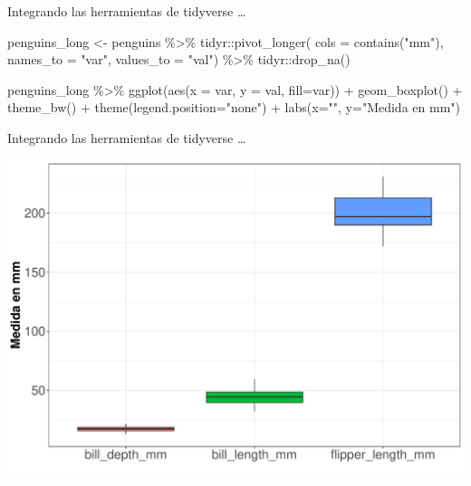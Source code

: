 \documentclass[
  ignorenonframetext,
  aspectratio=169]{beamer}
\newenvironment{Shaded}{\begin{snugshade}}{\end{snugshade}}
\newcommand{\AttributeTok}[1]{\textcolor[rgb]{0.77,0.63,0.00}{#1}}
\newcommand{\FunctionTok}[1]{\textcolor[rgb]{0.00,0.00,0.00}{#1}}
\newcommand{\NormalTok}[1]{#1}
\newcommand{\OtherTok}[1]{\textcolor[rgb]{0.56,0.35,0.01}{#1}}
\newcommand{\SpecialCharTok}[1]{\textcolor[rgb]{0.00,0.00,0.00}{#1}}
\newcommand{\StringTok}[1]{\textcolor[rgb]{0.31,0.60,0.02}{#1}}
\begin{document}
\begin{frame}[fragile]{Integrando las herramientas de tidyverse
\ldots{}}
\protect\hypertarget{integrando-las-herramientas-de-tidyverse}{}
\begin{Shaded}
\begin{Highlighting}[]
\NormalTok{penguins\_long }\OtherTok{\textless{}{-}}\NormalTok{ penguins }\SpecialCharTok{\%\textgreater{}\%} 
\NormalTok{  tidyr}\SpecialCharTok{::}\FunctionTok{pivot\_longer}\NormalTok{(}
    \AttributeTok{cols =} \FunctionTok{contains}\NormalTok{(}\StringTok{"mm"}\NormalTok{),}
    \AttributeTok{names\_to =} \StringTok{"var"}\NormalTok{, }\AttributeTok{values\_to =} \StringTok{"val"}\NormalTok{) }\SpecialCharTok{\%\textgreater{}\%} 
\NormalTok{  tidyr}\SpecialCharTok{::}\FunctionTok{drop\_na}\NormalTok{()}
\end{Highlighting}
\end{Shaded}

\begin{Shaded}
\begin{Highlighting}[]
\NormalTok{penguins\_long }\SpecialCharTok{\%\textgreater{}\%} 
  \FunctionTok{ggplot}\NormalTok{(}\FunctionTok{aes}\NormalTok{(}\AttributeTok{x =}\NormalTok{ var, }\AttributeTok{y =}\NormalTok{ val, }\AttributeTok{fill=}\NormalTok{var)) }\SpecialCharTok{+}
  \FunctionTok{geom\_boxplot}\NormalTok{() }\SpecialCharTok{+}
  \FunctionTok{theme\_bw}\NormalTok{() }\SpecialCharTok{+}
  \FunctionTok{theme}\NormalTok{(}\AttributeTok{legend.position=}\StringTok{"none"}\NormalTok{) }\SpecialCharTok{+}
  \FunctionTok{labs}\NormalTok{(}\AttributeTok{x=}\StringTok{""}\NormalTok{, }\AttributeTok{y=}\StringTok{"Medida en mm"}\NormalTok{)}
\end{Highlighting}
\end{Shaded}
\end{frame}

\begin{frame}{Integrando las herramientas de tidyverse \ldots{}}
\protect\hypertarget{integrando-las-herramientas-de-tidyverse-1}{}
\begin{center}\includegraphics[width=0.5\linewidth,height=0.5\textheight]{tidyverse_AD_files/figure-beamer/unnamed-chunk-142-1} \end{center}
\end{frame}
\end{document}
